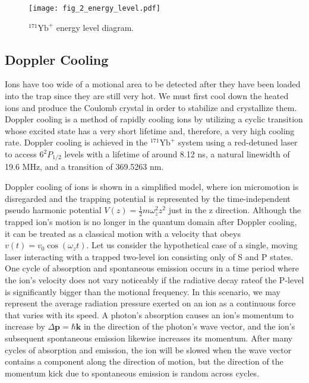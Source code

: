 \begin{figure}
    \centering
    \texttt{[image: fig\_2\_energy\_level.pdf]}
    \caption{${ }^{171} \mathrm{Yb}^{+}$ energy level diagram.}
    \label{fig:energy_level}
\end{figure}

\subsection{Doppler Cooling}

Ions have too wide of a motional area to be detected after they have been loaded into the trap since they are still very hot. We must first cool down the heated ions and produce the Coulomb crystal in order to stabilize and crystallize them. Doppler cooling is a method of rapidly cooling ions by utilizing a cyclic transition whose excited state has a very short lifetime and, therefore, a very high cooling rate. Doppler cooling is achieved in the ${ }^{171} \mathrm{Yb}^{+}$ system using a red-detuned laser to access $6^2 P_{1 / 2}$ levels with a lifetime of around 8.12 ns, a natural linewidth of 19.6 MHz, and a transition of 369.5263 nm.

Doppler cooling of ions is shown in a simplified model, where ion micromotion is disregarded and the trapping potential is represented by the time-independent pseudo harmonic potential $V(z)=\frac{1}{2} m \omega_z^2 z^2$ just in the z direction. Although the trapped ion's motion is no longer in the quantum domain after Doppler cooling, it can be treated as a classical motion with a velocity that obeys $v(t)=v_0 \cos \left(\omega_z t\right)$. Let us consider the hypothetical case of a single, moving laser interacting with a trapped two-level ion consisting only of S and P states. One cycle of absorption and spontaneous emission occurs in a time period where the ion's velocity does not vary noticeably if the radiative decay rateof the P-level is significantly bigger than the motional frequency. In this scenario, we may represent the average radiation pressure exerted on an ion as a continuous force that varies with its speed. A photon's absorption causes an ion's momentum to increase by $\Delta \mathbf{p}=\hbar \mathbf{k}$ in the direction of the photon's wave vector, and the ion's subsequent spontaneous emission likewise increases its momentum. After many cycles of absorption and emission, the ion will be slowed when the wave vector contains a component along the direction of motion, but the direction of the momentum kick due to spontaneous emission is random across cycles.

